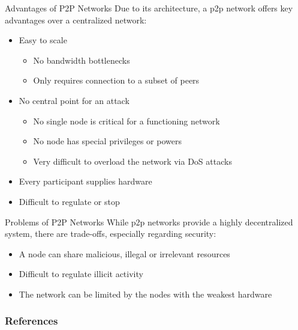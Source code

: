 \documentclass[handout]{beamer}
\begin{document}
\begin{frame}{Advantages of P2P Networks}
	Due to its architecture, a p2p network offers key advantages over a centralized network:
	\begin{itemize}
		\item Easy to scale
			\begin{itemize}
				\item No bandwidth bottlenecks
				\item Only requires connection to a subset of peers
			\end{itemize}
		\item No central point for an attack
			\begin{itemize}
				\item No single node is critical for a functioning network
				\item No node has special privileges or powers
				\item Very difficult to overload the network via DoS attacks
			\end{itemize}	
		\item Every participant supplies hardware
		\item Difficult to regulate or stop
	\end{itemize}
	
\end{frame}

\begin{frame}{Problems of P2P Networks}
	While p2p networks provide a highly decentralized system, there are trade-offs, especially regarding security:
	\begin{itemize}
		\item A node can share malicious, illegal or irrelevant resources
		\item Difficult to regulate illicit activity
		\item The network can be limited by the nodes with the weakest hardware
	\end{itemize}
	
\end{frame}


\begin{frame}%
\frametitle{References}
	
	
\end{frame}
\end{document}
